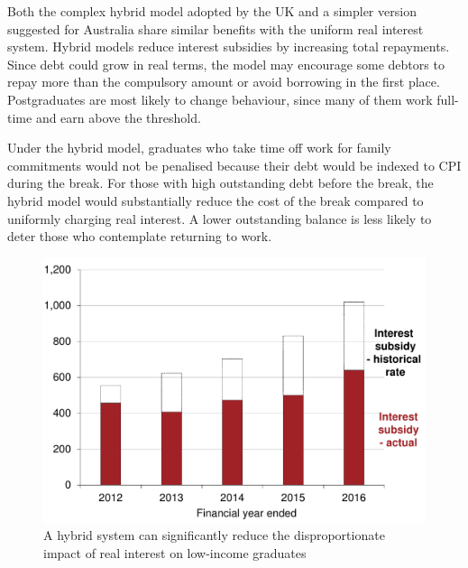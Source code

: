 \documentclass[embargoed]{grattan}
\begin{document}
{Both the complex hybrid model adopted by the UK and a simpler version suggested for Australia share similar benefits with the uniform real interest system.
Hybrid models reduce interest subsidies by increasing total repayments.
Since debt could grow in real terms, the model may encourage some debtors to repay more than the compulsory amount or avoid borrowing in the first place.
Postgraduates are most likely to change behaviour, since many of them work full-time and earn above the threshold.

Under the hybrid model, graduates who take time off work for family commitments would not be penalised because their debt would be indexed to \gls{CPI} during the break.
For those with high outstanding debt before the break, the hybrid model would substantially reduce the cost of the break compared to uniformly charging real interest.
A lower outstanding balance is less likely to deter those who contemplate returning to work.

\begin{figure}
\caption{A hybrid system can significantly reduce the disproportionate impact of real interest on low-income graduates}\label{fig:fig17-a-hybrid-system-can-signif-reduce-disprop-impact-of-real-interest-low-income-grads}


\includegraphics[page=17]{atlas/Chartpack.pdf}
\end{figure}

}
\end{document}
